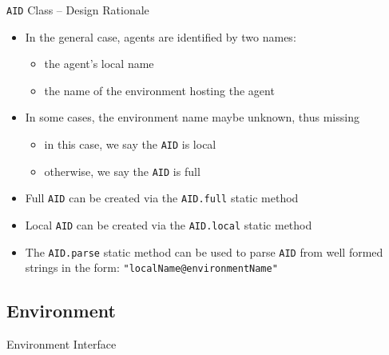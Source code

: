 \documentclass[presentation]{beamer}\mode<presentation>{\usetheme{AMSCesenaPurpleAndGold}}
\begin{document}
\begin{frame}{\texttt{AID} Class -- Design Rationale}
	
	\begin{itemize}
		
		\item In the general case, agents are identified by two names:
		\begin{itemize}
			\item the agent's \alert{local} name
			\item the name of the environment hosting the agent
		\end{itemize}
	
		\vfill
		
		\item In some cases, the environment name maybe unknown, thus missing
		\begin{itemize}
			\item in this case, we say the \texttt{AID} is \alert{local}
			\item otherwise, we say the \texttt{AID} is \alert{full}
		\end{itemize}
	
		\vfill
		
		\item Full \texttt{AID} can be created via the \texttt{AID.full} \alert{static} method
		
		\vfill
		
		\item Local \texttt{AID} can be created via the \texttt{AID.local} \alert{static} method
		
		\vfill
		
		\item The \texttt{AID.parse} \alert{static} method can be used to parse \texttt{AID} from well formed strings in the form: \texttt{"localName@environmentName"}
	\end{itemize}
	
\end{frame}

\subsection{Environment}

\begin{frame}[allowframebreaks]{Environment Interface}
    
    
    
\end{frame}
\end{document}
